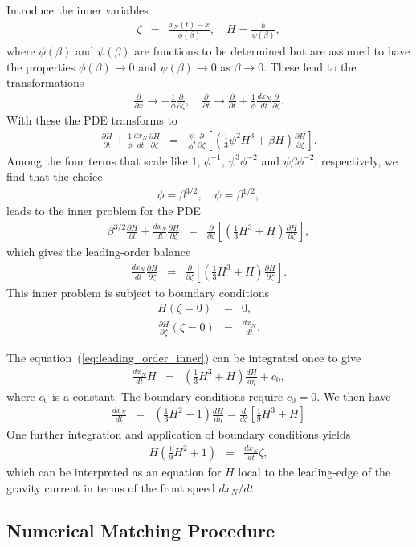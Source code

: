 \documentclass[11pt]{article}
\newcommand{\bea}{\begin{eqnarray}}
\newcommand{\eea}{\end{eqnarray}}
\begin{document}
Introduce the inner variables
\bea
\zeta & = & \frac{x_N(t) - x}{\phi(\beta)},\quad
H = \frac{h}{\psi(\beta)},
\eea
where $\phi(\beta)$ and $\psi(\beta)$ are functions to be determined but are assumed to have the properties 
$\phi(\beta) \rightarrow 0$ and $\psi(\beta) \rightarrow 0$ as $\beta \rightarrow 0$.  These lead to the transformations
\bea
\frac{\partial}{\partial x}  \rightarrow  - \frac{1}{\phi} \frac{\partial}{\partial \zeta},\quad
\frac{\partial}{\partial t}  \rightarrow  \frac{\partial}{\partial t} + \frac{1}{\phi} \frac{dx_N}{dt} \frac{\partial}{\partial \zeta}.
\eea
With these the PDE transforms to
\bea
\frac{\partial H}{\partial t} + \frac{1}{\phi} \frac{dx_N}{dt} \frac{\partial H}{\partial \zeta} & = & \frac{\psi}{\phi^2} \frac{\partial}{\partial \zeta} 
\left[ \left( \frac{1}{3} \psi^2 H^3 + \beta H \right) \frac{\partial H}{\partial \zeta} \right].
\eea
Among the four terms that scale like $1$, $\phi^{-1}$, $\psi^3 \phi^{-2}$ and $\psi \beta \phi^{-2}$, respectively, we find that the choice
\bea
\phi = \beta^{3/2},\quad
\psi = \beta^{1/2},
\eea
leads to the inner problem for the PDE
\bea
\beta^{3/2} \frac{\partial H}{\partial t} + \frac{dx_N}{dt} \frac{\partial H}{\partial \zeta} & = & \frac{\partial}{\partial \zeta} 
\left[ \left( \frac{1}{3} H^3 + H \right) \frac{\partial H}{\partial \zeta} \right],
\eea
which gives the leading-order balance
\bea
\label{eq:leading_order_inner}
\frac{dx_N}{dt} \frac{\partial H}{\partial \zeta} & = & \frac{\partial}{\partial \zeta} 
\left[ \left( \frac{1}{3} H^3 + H \right) \frac{\partial H}{\partial \zeta} \right].
\eea
This inner problem is subject to boundary conditions 
\bea
H(\zeta=0) & = & 0, \\
\frac{\partial H}{\partial \zeta}(\zeta=0) & = & \frac{dx_N}{dt}.
\eea

The equation~(\ref{eq:leading_order_inner}) can be integrated once to give
\bea
\frac{dx_N}{dt} H & = & \left( \frac{1}{3} H^3 + H \right) \frac{dH}{d\eta} + c_0,
\eea
where $c_0$ is a constant.  The boundary conditions require $c_0=0$.  We then have
\bea
\frac{dx_N}{dt} & = & \left( \frac{1}{3} H^2 + 1 \right) \frac{dH}{d\eta} = \frac{d}{d\zeta} \left[ \frac{1}{9} H^3 + H \right]
\eea
One further integration and application of boundary conditions yields
\bea
\label{eq:inner_solution}
H \left( \frac{1}{9} H^2 + 1 \right) & = & \frac{dx_N}{dt} \zeta,
\eea
which can be interpreted as an equation for $H$ local to the leading-edge of the gravity current in terms of the front speed $dx_N/dt$.

\subsection{Numerical Matching Procedure}
\end{document}
